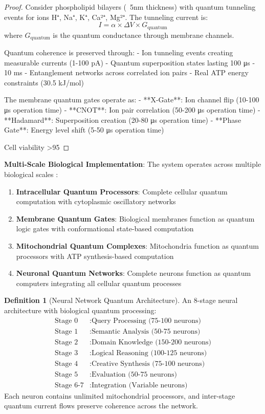 \documentclass[12pt,a4paper]{article}
\theoremstyle{definition}
\newtheorem{definition}{Definition}[section]
\begin{document}
{\begin{proof}
Consider phospholipid bilayers (~5nm thickness) with quantum tunneling events for ions H⁺, Na⁺, K⁺, Ca²⁺, Mg²⁺. The tunneling current is:
$$I = \alpha \times \Delta V \times G_{\text{quantum}}$$
where $G_{\text{quantum}}$ is the quantum conductance through membrane channels.

Quantum coherence is preserved through:
- Ion tunneling events creating measurable currents (1-100 pA)
- Quantum superposition states lasting 100 μs - 10 ms
- Entanglement networks across correlated ion pairs
- Real ATP energy constraints (30.5 kJ/mol)

The membrane quantum gates operate as:
- **X-Gate**: Ion channel flip (10-100 μs operation time)
- **CNOT**: Ion pair correlation (50-200 μs operation time)
- **Hadamard**: Superposition creation (20-80 μs operation time)
- **Phase Gate**: Energy level shift (5-50 μs operation time)

Cell viability >95%
\end{proof}

\textbf{Multi-Scale Biological Implementation}: The system operates across multiple biological scales \cite{sachikonye2024biological}:

\begin{enumerate}
\item \textbf{Intracellular Quantum Processors}: Complete cellular quantum computation with cytoplasmic oscillatory networks
\item \textbf{Membrane Quantum Gates}: Biological membranes function as quantum logic gates with conformational state-based computation
\item \textbf{Mitochondrial Quantum Complexes}: Mitochondria function as quantum processors with ATP synthesis-based computation
\item \textbf{Neuronal Quantum Networks}: Complete neurons function as quantum computers integrating all cellular quantum processes
\end{enumerate}

\begin{definition}[Neural Network Quantum Architecture]
An 8-stage neural architecture with biological quantum processing:
\begin{align}
\text{Stage 0} &: \text{Query Processing (75-100 neurons)} \\
\text{Stage 1} &: \text{Semantic Analysis (50-75 neurons)} \\
\text{Stage 2} &: \text{Domain Knowledge (150-200 neurons)} \\
\text{Stage 3} &: \text{Logical Reasoning (100-125 neurons)} \\
\text{Stage 4} &: \text{Creative Synthesis (75-100 neurons)} \\
\text{Stage 5} &: \text{Evaluation (50-75 neurons)} \\
\text{Stage 6-7} &: \text{Integration (Variable neurons)}
\end{align}
Each neuron contains unlimited mitochondrial processors, and inter-stage quantum current flows preserve coherence across the network.
\end{definition}

}
\end{document}
